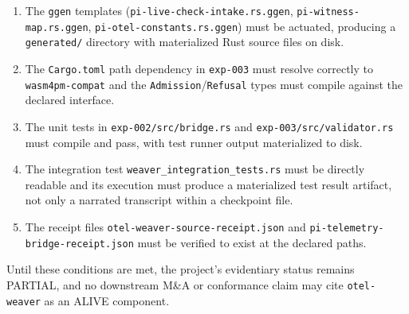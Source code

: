 \begin{enumerate}
  \item The \texttt{ggen} templates (\texttt{pi-live-check-intake.rs.ggen},
    \texttt{pi-witness-map.rs.ggen}, \texttt{pi-otel-constants.rs.ggen}) must be actuated,
    producing a \texttt{generated/} directory with materialized Rust source files on disk.
  \item The \texttt{Cargo.toml} path dependency in \texttt{exp-003} must resolve correctly
    to \texttt{wasm4pm-compat} and the \texttt{Admission}/\texttt{Refusal} types must
    compile against the declared interface.
  \item The unit tests in \texttt{exp-002/src/bridge.rs} and \texttt{exp-003/src/validator.rs}
    must compile and pass, with test runner output materialized to disk.
  \item The integration test \texttt{weaver\_integration\_tests.rs} must be directly readable
    and its execution must produce a materialized test result artifact, not only a narrated
    transcript within a checkpoint file.
  \item The receipt files \texttt{otel-weaver-source-receipt.json} and
    \texttt{pi-telemetry-bridge-receipt.json} must be verified to exist at the declared paths.
\end{enumerate}

Until these conditions are met, the project's evidentiary status remains PARTIAL, and no
downstream M\&A or conformance claim may cite \texttt{otel-weaver} as an ALIVE component.
